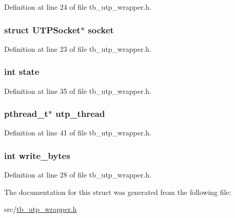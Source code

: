 Definition at line 24 of file tb\-\_\-utp\-\_\-wrapper.\-h.

\hypertarget{structtb__utp__wrapper__t_add15e39a83c7a0c72140c305bdd386d0}{
\subsubsection[{socket}]{\setlength{\rightskip}{0pt plus 5cm}struct U\-T\-P\-Socket$\ast$ socket}}\label{structtb__utp__wrapper__t_add15e39a83c7a0c72140c305bdd386d0}


Definition at line 23 of file tb\-\_\-utp\-\_\-wrapper.\-h.

\hypertarget{structtb__utp__wrapper__t_a89f234133d3efe315836311cbf21c64b}{
\subsubsection[{state}]{\setlength{\rightskip}{0pt plus 5cm}int state}}\label{structtb__utp__wrapper__t_a89f234133d3efe315836311cbf21c64b}


Definition at line 35 of file tb\-\_\-utp\-\_\-wrapper.\-h.

\hypertarget{structtb__utp__wrapper__t_aa0eb12bac5ef0d83e6689f3b547b695d}{
\subsubsection[{utp\-\_\-thread}]{\setlength{\rightskip}{0pt plus 5cm}pthread\-\_\-t$\ast$ utp\-\_\-thread}}\label{structtb__utp__wrapper__t_aa0eb12bac5ef0d83e6689f3b547b695d}


Definition at line 41 of file tb\-\_\-utp\-\_\-wrapper.\-h.

\hypertarget{structtb__utp__wrapper__t_a814ec097a6a396e10f9f0924e924684e}{
\subsubsection[{write\-\_\-bytes}]{\setlength{\rightskip}{0pt plus 5cm}int write\-\_\-bytes}}\label{structtb__utp__wrapper__t_a814ec097a6a396e10f9f0924e924684e}


Definition at line 28 of file tb\-\_\-utp\-\_\-wrapper.\-h.



The documentation for this struct was generated from the following file\-:\begin{DoxyCompactItemize}
\item 
src/\hyperlink{tb__utp__wrapper_8h}{tb\-\_\-utp\-\_\-wrapper.\-h}\end{DoxyCompactItemize}
